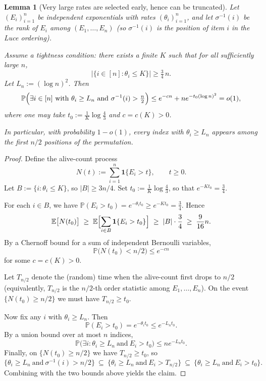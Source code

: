 \documentclass[10pt]{article}
\newtheorem{lem}[thm]{Lemma}
\numberwithin{equation}{section}
\begin{document}
\begin{lem}[Very large rates are selected early, hence can be truncated]
\label{lem:huge-early}
Let $(E_i)_{i=1}^n$ be independent exponentials with rates $(\theta_i)_{i=1}^n$,
and let $\sigma^{-1}(i)$ be the rank of $E_i$ among $(E_1,\dots,E_n)$ (so $\sigma^{-1}(i)$
is the position of item $i$ in the Luce ordering).

Assume a \emph{tightness} condition: there exists a finite $K$ such that for all
sufficiently large $n$,
\[
\bigl|\{i\in[n]: \theta_i \le K\}\bigr| \ge \tfrac34\,n .
\]
Let $L_n := (\log n)^2$. Then
\[
\mathbb P\Bigl(\exists i\in[n]\ \text{with}\ \theta_i \ge L_n\ \text{and}\ \sigma^{-1}(i) > \tfrac n2\Bigr)
\le e^{-c n} + n e^{-t_0 (\log n)^2} = o(1),
\]
where one may take $t_0 := \frac1K\log\frac43$ and $c=c(K)>0$.

In particular, with probability $1-o(1)$, every index with $\theta_i \ge L_n$ appears
among the first $n/2$ positions of the permutation.
\end{lem}

\begin{proof}
Define the alive-count process
\[
N(t) := \sum_{i=1}^n \mathbf 1\{E_i>t\},\qquad t\ge 0.
\]
Let $B:=\{i:\theta_i\le K\}$, so $|B|\ge 3n/4$.
Set $t_0 := \frac1K\log\frac43$, so that $e^{-K t_0}=\frac34$.

For each $i\in B$, we have $\mathbb P(E_i>t_0)=e^{-\theta_i t_0}\ge e^{-K t_0}=\frac34$.
Hence
\[
\mathbb E\bigl[N(t_0)\bigr] \;\ge\; \mathbb E\Bigl[\sum_{i\in B}\mathbf 1\{E_i>t_0\}\Bigr]
\;\ge\; |B|\cdot \frac34 \;\ge\; \frac{9}{16}n.
\]
By a Chernoff bound for a sum of independent Bernoulli variables,
\[
\mathbb P\bigl(N(t_0) < n/2\bigr) \le e^{-c n}
\]
for some $c=c(K)>0$.

Let $T_{n/2}$ denote the (random) time when the alive-count first drops to $n/2$
(equivalently, $T_{n/2}$ is the $n/2$-th order statistic among $E_1,\dots,E_n$).
On the event $\{N(t_0)\ge n/2\}$ we must have $T_{n/2}\ge t_0$.

Now fix any $i$ with $\theta_i\ge L_n$. Then
\[
\mathbb P(E_i>t_0)=e^{-\theta_i t_0}\le e^{-L_n t_0}.
\]
By a union bound over at most $n$ indices,
\[
\mathbb P\bigl(\exists i:\theta_i\ge L_n \ \text{and}\ E_i>t_0\bigr)\le n e^{-L_n t_0}.
\]
Finally, on $\{N(t_0)\ge n/2\}$ we have $T_{n/2}\ge t_0$, so
\[
\{\theta_i\ge L_n \ \text{and}\ \sigma^{-1}(i)>n/2\}
\ \subseteq\ 
\{\theta_i\ge L_n \ \text{and}\ E_i>T_{n/2}\}
\ \subseteq\
\{\theta_i\ge L_n \ \text{and}\ E_i>t_0\}.
\]
Combining with the two bounds above yields the claim.
\end{proof}
\end{document}
